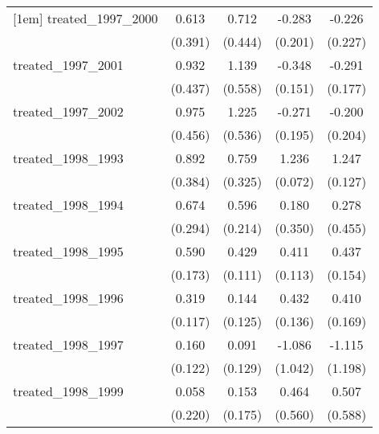 {\begin{tabular}{l*{4}{c}}
[1em]
treated\_1997\_2000&       0.613         &       0.712         &      -0.283         &      -0.226         \\
            &     (0.391)         &     (0.444)         &     (0.201)         &     (0.227)         \\
[1em]
treated\_1997\_2001&       0.932\sym{*}  &       1.139\sym{*}  &      -0.348\sym{*}  &      -0.291         \\
            &     (0.437)         &     (0.558)         &     (0.151)         &     (0.177)         \\
[1em]
treated\_1997\_2002&       0.975\sym{*}  &       1.225\sym{*}  &      -0.271         &      -0.200         \\
            &     (0.456)         &     (0.536)         &     (0.195)         &     (0.204)         \\
[1em]
treated\_1998\_1993&       0.892\sym{*}  &       0.759\sym{*}  &       1.236\sym{***}&       1.247\sym{***}\\
            &     (0.384)         &     (0.325)         &     (0.072)         &     (0.127)         \\
[1em]
treated\_1998\_1994&       0.674\sym{*}  &       0.596\sym{**} &       0.180         &       0.278         \\
            &     (0.294)         &     (0.214)         &     (0.350)         &     (0.455)         \\
[1em]
treated\_1998\_1995&       0.590\sym{***}&       0.429\sym{***}&       0.411\sym{***}&       0.437\sym{**} \\
            &     (0.173)         &     (0.111)         &     (0.113)         &     (0.154)         \\
[1em]
treated\_1998\_1996&       0.319\sym{**} &       0.144         &       0.432\sym{**} &       0.410\sym{*}  \\
            &     (0.117)         &     (0.125)         &     (0.136)         &     (0.169)         \\
[1em]
treated\_1998\_1997&       0.160         &       0.091         &      -1.086         &      -1.115         \\
            &     (0.122)         &     (0.129)         &     (1.042)         &     (1.198)         \\
[1em]
treated\_1998\_1999&       0.058         &       0.153         &       0.464         &       0.507         \\
            &     (0.220)         &     (0.175)         &     (0.560)         &     (0.588)         \\

\end{tabular}}
